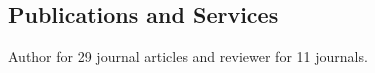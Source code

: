 \documentclass[centered,11pt,overlapped]{res}
\begin{document}
\begin{resume}
{%
\section{\sc Publications and Services}
Author for 29 journal articles and reviewer for 11 journals.
}


\end{resume}
\end{document}
